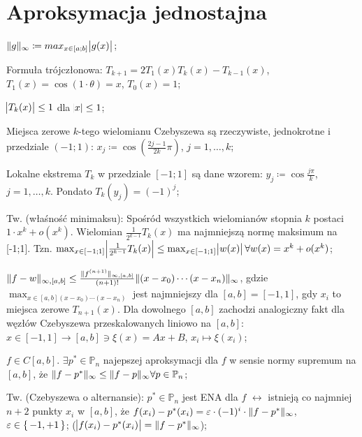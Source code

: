 \section{Aproksymacja jednostajna}

\entry
$\|g\|_\infty \coloneqq max_{x \in [a;b]} \abs{g(x)}$;

\entry
Formuła trójczłonowa:
$T_{k + 1} = 2T_1(x)T_k(x) - T_{k-1}(x)$,
$T_1(x) = \cos(1 \cdot \theta)=x$,
$T_0(x) = 1$;

\entry
$\abs{T_k(x)} \leq 1$
dla
$\abs{x} \leq 1$;

\entry
Miejsca zerowe $k$-tego wielomianu Czebyszewa są rzeczywiste, jednokrotne i przedziale $(-1;1)$: 
$x_j \coloneqq \cos(\frac{2j-1}{2k}\pi)$, 
$j=1,\ldots,k$;

\entry
Lokalne ekstrema $T_k$ w przedziale $[-1;1]$ są dane wzorem:
$y_j \coloneqq \cos \frac{j\pi}{k}$,
$j=1,\ldots,k$.
Pondato
$T_k(y_j) = (-1)^j$;

\entry
Tw. (właśność minimaksu):
Spośród wszystkich wielomianów stopnia $k$ postaci
$1 \cdot x^k + o(x^k)$.
Wielomian 
$\frac{1}{2^{k-1}} T_k(x)$
ma najmniejszą normę maksimum na [-1;1].
Tzn.
$\max_{x \in [-1;1]} \abs{\frac{1}{2^{k-1}} T_k(x)} \leq 
\max_{x \in [-1;1]} \abs{w(x)} 
\forall w(x) = x^k + o(x^k)$;

\entry
$\|f-w\|_{\infty, [a,b]} \leq 
\frac{\|f^{(n+1)}\|_{\infty, [a,b]}}{(n+1)!} 
\|(x-x_0) \cdots (x - x_n)\|_\infty$, 
gdzie
$\max_{x\in[a,b] (x-x_0)\cdots(x-x_n)}$
jest najmniejszy dla 
$[a,b] = [-1,1]$,
gdy $x_i$ to miejsca zerowe $T_{n + 1}(x)$.
Dla dowolnego $[a,b]$ zachodzi analogiczny fakt dla węzłów Czebyszewa 
przeskalowanych liniowo na $[a,b]$:
$x \in [-1,1] \rightarrow [a,b] \ni \xi(x) = Ax + B$,
$x_i \mapsto \xi(x_i)$;

\entry
$f \in C[a,b]$.
$\exists p^{*} \in \mathbb{P}_n$ 
najepszej aproksymacji dla $f$ w sensie normy supremum na $[a,b]$, że
$\|f - p^{*}\|_\infty \leq \|f - p\|_\infty \forall p\in \mathbb{P}_n$;

\entry
Tw. (Czebyszewa o alternansie):
$p^{*} \in \mathbb{P}_n$
jest ENA dla $f$
$\leftrightarrow$
istnieją co najmniej $n+2$ punkty $x_i$ w $[a,b]$, że
$f(x_i) - p^{*}(x_i) = \varepsilon \cdot (-1)^i \cdot \|f - p^{*}\|_\infty$,
$\varepsilon \in \set{-1,+1}$;
($\abs{f(x_i) - p^{*}(x_i)} = \|f - p^{*}\|_\infty$);

